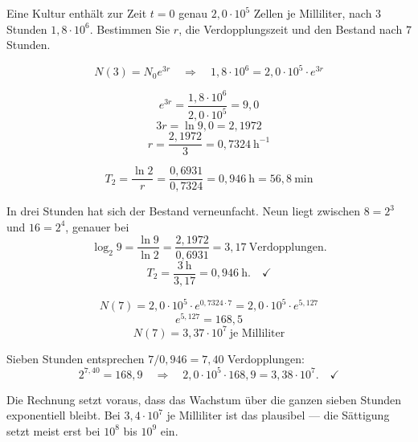 \begin{aufgabe}
Eine Kultur enthält zur Zeit $t=0$ genau $2{,}0\cdot10^5$ Zellen je Milliliter, nach $3$ Stunden $1{,}8\cdot10^6$. Bestimmen Sie $r$, die Verdopplungszeit und den Bestand nach $7$ Stunden.

\loesung
{}
\[ N(3) = N_0e^{3r} \quad\Longrightarrow\quad 1{,}8\cdot10^6 = 2{,}0\cdot10^5 \cdot e^{3r} \]

\[ e^{3r} = \frac{1{,}8\cdot10^6}{2{,}0\cdot10^5} = 9{,}0 \]
\[ 3r = \ln 9{,}0 = 2{,}1972 \]
\[ r = \frac{2{,}1972}{3} = 0{,}7324\ \mathrm{h}^{-1} \]

\[ T_2 = \frac{\ln 2}{r} = \frac{0{,}6931}{0{,}7324} = 0{,}946\ \text{h} = 56{,}8\ \text{min} \]

In drei Stunden hat sich der Bestand verneunfacht. Neun liegt zwischen $8 = 2^3$ und $16 = 2^4$, genauer bei
\[ \log_2 9 = \frac{\ln 9}{\ln 2} = \frac{2{,}1972}{0{,}6931} = 3{,}17 \ \text{Verdopplungen} . \]
\[ T_2 = \frac{3\ \text{h}}{3{,}17} = 0{,}946\ \text{h} . \quad \checkmark \]

\[ N(7) = 2{,}0\cdot10^5 \cdot e^{0{,}7324 \cdot 7} = 2{,}0\cdot10^5 \cdot e^{5{,}127} \]
\[ e^{5{,}127} = 168{,}5 \]
\[ N(7) = 3{,}37\cdot10^{7} \ \text{je Milliliter} \]

Sieben Stunden entsprechen $7/0{,}946 = 7{,}40$ Verdopplungen:
\[ 2^{7{,}40} = 168{,}9 \quad\Longrightarrow\quad 2{,}0\cdot10^5 \cdot 168{,}9 = 3{,}38\cdot10^7 . \quad \checkmark \]

Die Rechnung setzt voraus, dass das Wachstum über die ganzen sieben Stunden exponentiell bleibt. Bei $3{,}4\cdot10^7$ je Milliliter ist das plausibel --- die Sättigung setzt meist erst bei $10^8$ bis $10^9$ ein.

\begin{center}
\begin{minipage}{0.86\textwidth}
\end{minipage}
\end{center}
\end{aufgabe}

